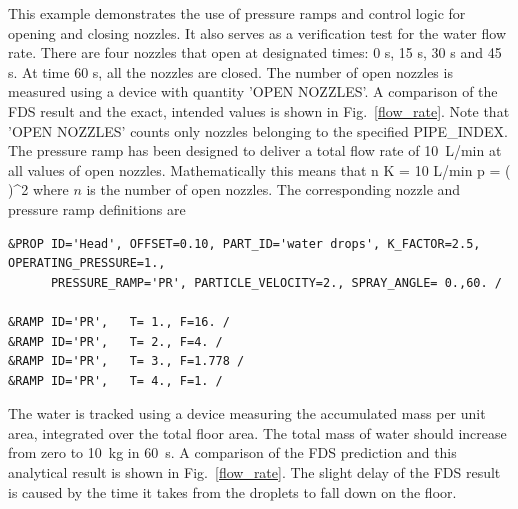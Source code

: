 \documentclass[11pt]{book}
\begin{document}
This example demonstrates the use of pressure ramps and control logic for opening and closing nozzles. It also serves as a verification test for
the water flow rate. There are four nozzles that open at designated times: 0 s, 15 s, 30 s and 45 s. At time 60 s, all the nozzles are closed.
The number of open nozzles is measured using a device with quantity {\ct 'OPEN NOZZLES'}. A comparison of the FDS result and the exact, intended values
is shown in Fig.~\ref{flow_rate}.  Note that {\ct 'OPEN NOZZLES'} counts only nozzles belonging to the specified {\ct PIPE\_INDEX}.
The pressure ramp has been designed to deliver a total flow rate of 10~L/min at all values of open nozzles. Mathematically this means that
\be
n K  = 10 \;\hbox{L/min} \quad \Rightarrow \quad
p = \left( \right)^2
\ee
where $n$ is the number of open nozzles. The corresponding nozzle and pressure ramp definitions are

\begin{lstlisting}
&PROP ID='Head', OFFSET=0.10, PART_ID='water drops', K_FACTOR=2.5, OPERATING_PRESSURE=1.,
      PRESSURE_RAMP='PR', PARTICLE_VELOCITY=2., SPRAY_ANGLE= 0.,60. /

&RAMP ID='PR',   T= 1., F=16. /
&RAMP ID='PR',   T= 2., F=4. /
&RAMP ID='PR',   T= 3., F=1.778 /
&RAMP ID='PR',   T= 4., F=1. /
\end{lstlisting}

\noindent The water is tracked using a device measuring the accumulated mass per unit area, integrated over the total floor area. The total mass of water should increase from zero to 10~kg in 60~s. A comparison of the FDS prediction and this analytical result is shown in Fig.~\ref{flow_rate}. The slight delay of the FDS result is caused by the time it takes from the droplets to fall down on the floor.
\end{document}
